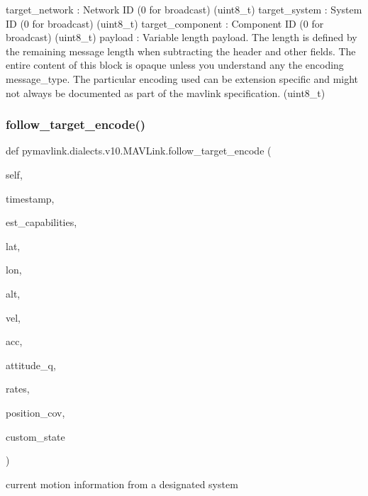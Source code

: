 \begin{DoxyVerb}
\begin{DoxyVerb}
\begin{DoxyVerb}
target_network            : Network ID (0 for broadcast) (uint8_t)
target_system             : System ID (0 for broadcast) (uint8_t)
target_component          : Component ID (0 for broadcast) (uint8_t)
payload                   : Variable length payload. The length is defined by the remaining message length when subtracting the header and other fields.  The entire content of this block is opaque unless you understand any the encoding message_type.  The particular encoding used can be extension specific and might not always be documented as part of the mavlink specification. (uint8_t)\end{DoxyVerb}
 \mbox{\label{classpymavlink_1_1dialects_1_1v10_1_1MAVLink_a691c5a98e578c3d885a11883a34dd8e4}} 
\subsubsection{\texorpdfstring{follow\+\_\+target\+\_\+encode()}{follow\_target\_encode()}}
{\footnotesize\ttfamily def pymavlink.\+dialects.\+v10.\+M\+A\+V\+Link.\+follow\+\_\+target\+\_\+encode (\begin{DoxyParamCaption}\item[{}]{self,  }\item[{}]{timestamp,  }\item[{}]{est\+\_\+capabilities,  }\item[{}]{lat,  }\item[{}]{lon,  }\item[{}]{alt,  }\item[{}]{vel,  }\item[{}]{acc,  }\item[{}]{attitude\+\_\+q,  }\item[{}]{rates,  }\item[{}]{position\+\_\+cov,  }\item[{}]{custom\+\_\+state }\end{DoxyParamCaption})}

\begin{DoxyVerb}current motion information from a designated system


\end{DoxyVerb}
\end{DoxyVerb}
\end{DoxyVerb}
